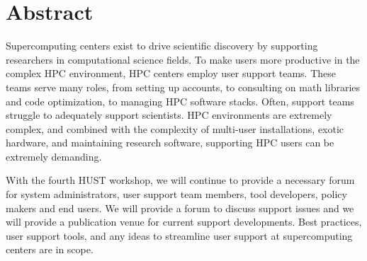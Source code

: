 \documentclass[a4paper,11pt]{article}
\begin{document}

\section*{Abstract}
\label{sec:abstract}

Supercomputing centers exist to drive scientific discovery by supporting researchers in 
computational science fields.  To make users more productive in the complex HPC
environment, HPC centers employ user support teams.  These teams
serve many roles, from setting up accounts, to consulting on math libraries and code
optimization, to managing HPC software stacks.
Often, support teams struggle to adequately support scientists.
HPC environments are extremely complex, and combined with
the complexity of multi-user installations, exotic hardware, and maintaining
research software, supporting HPC users can be extremely demanding.

With the fourth HUST workshop, we will continue to provide a necessary forum for 
system administrators, user support team members, tool developers, policy makers and
end users.  We will provide a forum to discuss support issues and we will
provide a publication venue for current support developments.  Best practices,
user support tools, and any ideas to streamline user support at supercomputing
centers are in scope.

\end{document}
